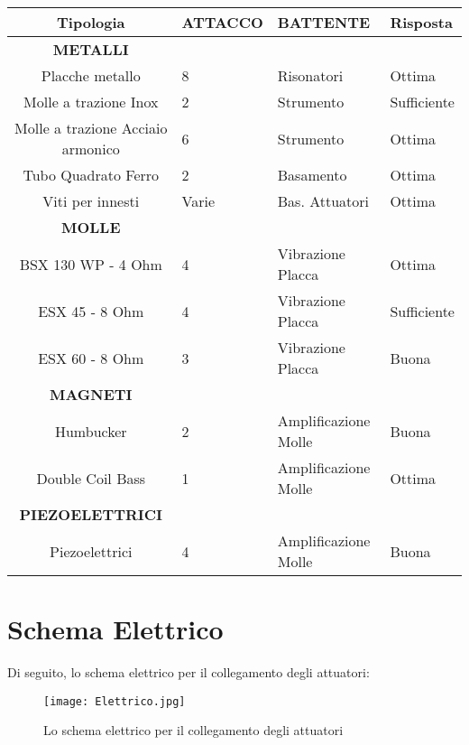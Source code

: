 \begin{tabular}{cp{2cm}p{2cm}p{2cm}} \textbf{Tipologia}&\textbf{ATTACCO}&\textbf{BATTENTE}&\textbf{Risposta}\\
\hline \textbf{METALLI}\\
\hline Placche metallo&8&Risonatori&Ottima\\
\hline Molle a trazione Inox&2&Strumento&Sufficiente\\
\hline Molle a trazione Acciaio armonico&6&Strumento&Ottima\\
\hline Tubo Quadrato Ferro&2&Basamento&Ottima\\
\hline Viti per innesti&Varie&Bas. Attuatori&Ottima\\
\hline \textbf{MOLLE}\\
\hline BSX 130 WP - 4 Ohm&4&Vibrazione Placca&Ottima\\
\hline ESX 45 - 8 Ohm&4&Vibrazione Placca&Sufficiente\\
\hline ESX 60 - 8 Ohm&3&Vibrazione Placca&Buona\\
\hline \textbf{MAGNETI}\\
\hline Humbucker&2&Amplificazione Molle&Buona\\
\hline Double Coil Bass&1&Amplificazione Molle&Ottima\\
\hline \textbf{PIEZOELETTRICI} \\
\hline Piezoelettrici&4&Amplificazione Molle&Buona\\
\hline
\end{tabular}

\section{Schema Elettrico}
Di seguito, lo schema elettrico per il collegamento degli attuatori:

\begin{figure}
\begin{center}
\texttt{[image: Elettrico.jpg]}
\caption{Lo schema elettrico per il collegamento degli attuatori}
\label{default}
\end{center}
\end{figure}
